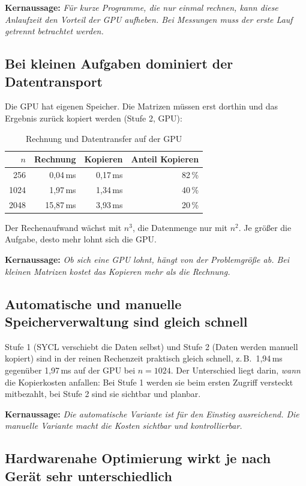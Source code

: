 \documentclass[11pt]{article}
\newcommand{\kernaussage}[1]{\par\smallskip\noindent\textbf{Kernaussage:} \emph{#1}\par\smallskip}
\begin{document}
\kernaussage{Für kurze Programme, die nur einmal rechnen, kann diese Anlaufzeit
den Vorteil der GPU aufheben. Bei Messungen muss der erste Lauf getrennt
betrachtet werden.}

\subsection{Bei kleinen Aufgaben dominiert der Datentransport}

Die GPU hat eigenen Speicher. Die Matrizen müssen erst dorthin und das
Ergebnis zurück kopiert werden (Stufe 2, GPU):

\begin{table}[h]
\centering
\begin{tabular}{@{}rrrr@{}}
\toprule
$n$ & \textbf{Rechnung} & \textbf{Kopieren} & \textbf{Anteil Kopieren} \\
\midrule
256 & 0{,}04\,ms & 0{,}17\,ms & 82\,\% \\
1024 & 1{,}97\,ms & 1{,}34\,ms & 40\,\% \\
2048 & 15{,}87\,ms & 3{,}93\,ms & 20\,\% \\
\bottomrule
\end{tabular}
\caption{Rechnung und Datentransfer auf der GPU}
\end{table}

Der Rechenaufwand wächst mit $n^3$, die Datenmenge nur mit $n^2$. Je
größer die Aufgabe, desto mehr lohnt sich die GPU.

\kernaussage{Ob sich eine GPU lohnt, hängt von der Problemgröße ab. Bei kleinen
Matrizen kostet das Kopieren mehr als die Rechnung.}

\subsection{Automatische und manuelle Speicherverwaltung sind gleich schnell}

Stufe 1 (SYCL verschiebt die Daten selbst) und Stufe 2 (Daten werden
manuell kopiert) sind in der reinen Rechenzeit praktisch gleich schnell,
z.\,B.\ 1{,}94\,ms gegenüber 1{,}97\,ms auf der GPU bei $n = 1024$. Der
Unterschied liegt darin, \emph{wann} die Kopierkosten anfallen: Bei Stufe
1 werden sie beim ersten Zugriff versteckt mitbezahlt, bei Stufe 2 sind
sie sichtbar und planbar.

\kernaussage{Die automatische Variante ist für den Einstieg ausreichend. Die
manuelle Variante macht die Kosten sichtbar und kontrollierbar.}

\subsection{Hardwarenahe Optimierung wirkt je nach Gerät sehr unterschiedlich}
\end{document}
